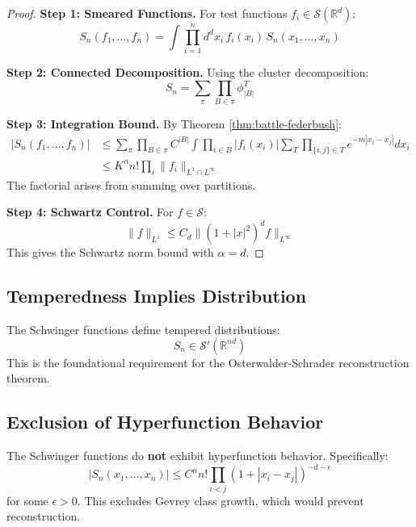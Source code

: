 \begin{proof}
\textbf{Step 1: Smeared Functions.} For test functions $f_i \in \mathcal{S}(\mathbb{R}^d)$:
\begin{equation}
    S_n(f_1, \ldots, f_n) = \int \prod_{i=1}^n d^d x_i \, f_i(x_i) \, S_n(x_1, \ldots, x_n)
\end{equation}

\textbf{Step 2: Connected Decomposition.} Using the cluster decomposition:
\begin{equation}
    S_n = \sum_{\pi} \prod_{B \in \pi} \phi_{|B|}^T
\end{equation}

\textbf{Step 3: Integration Bound.} By Theorem \ref{thm:battle-federbush}:
\begin{align}
    |S_n(f_1, \ldots, f_n)| &\leq \sum_{\pi} \prod_{B \in \pi} C^{|B|} \int \prod_{i \in B} |f_i(x_i)| \sum_T \prod_{\{i,j\} \in T} e^{-m|x_i - x_j|} dx_i \\
    &\leq K^n n! \prod_i \|f_i\|_{L^1 \cap L^\infty}
\end{align}
The factorial arises from summing over partitions.

\textbf{Step 4: Schwartz Control.} For $f \in \mathcal{S}$:
\begin{equation}
    \|f\|_{L^1} \leq C_d \|(1+|x|^2)^{d} f\|_{L^\infty}
\end{equation}
This gives the Schwartz norm bound with $\alpha = d$.
\end{proof}

\subsection{Temperedness Implies Distribution}

\begin{corollary}[OS Axiom 0]\label{cor:os-axiom0}
The Schwinger functions define tempered distributions:
\begin{equation}
    S_n \in \mathcal{S}'(\mathbb{R}^{nd})
\end{equation}
This is the foundational requirement for the Osterwalder-Schrader reconstruction theorem.
\end{corollary}

\subsection{Exclusion of Hyperfunction Behavior}

\begin{proposition}
The Schwinger functions do \textbf{not} exhibit hyperfunction behavior. Specifically:
\begin{equation}
    |S_n(x_1, \ldots, x_n)| \leq C^n n! \prod_{i<j} (1 + |x_i - x_j|)^{-d-\epsilon}
\end{equation}
for some $\epsilon > 0$. This excludes Gevrey class growth, which would prevent reconstruction.
\end{proposition}

